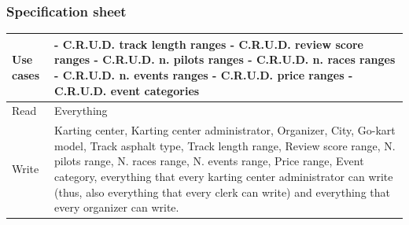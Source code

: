 \documentclass{beamer}
\begin{document}
\begin{frame}
    \frametitle{Specification sheet}
    \begin{table}
        \tiny
        \begin{tabular}{|p{2cm}|p{6cm}|}
        \hline
        Use cases &
        - C.R.U.D. track length ranges \newline
        - C.R.U.D. review score ranges \newline
        - C.R.U.D. n. pilots ranges \newline
        - C.R.U.D. n. races ranges \newline
        - C.R.U.D. n. events ranges \newline
        - C.R.U.D. price ranges \newline
        - C.R.U.D. event categories \\
        \hline
        Read & Everything \\
        \hline
        Write & Karting center, Karting center administrator, Organizer, City, Go-kart model, Track asphalt type, Track length range, Review score range, N. pilots range,
        N. races range, N. events range, Price range, Event category, everything that every karting center administrator can write (thus, also everything that every clerk can write) and 
        everything that every organizer can write. \\
        \hline
        \end{tabular}
    \end{table}
\end{frame}
\end{document}
